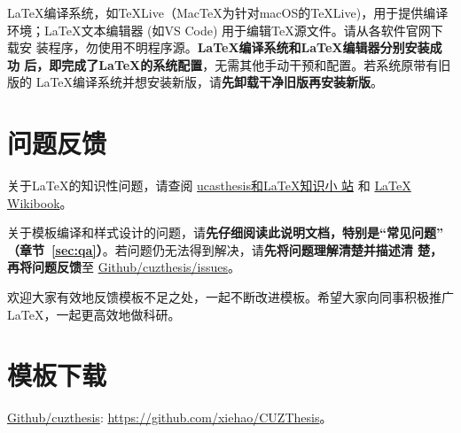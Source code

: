 \LaTeX{}编译系统，如\TeX{}Live（Mac\TeX{}为针对macOS的\TeX{}Live)，用于提供编译
环境；\LaTeX{}文本编辑器 (如VS Code) 用于编辑\TeX{}源文件。请从各软件官网下载安
装程序，勿使用不明程序源。\textbf{\LaTeX{}编译系统和\LaTeX{}编辑器分别安装成功
后，即完成了\LaTeX{}的系统配置}，无需其他手动干预和配置。若系统原带有旧版的
\LaTeX{}编译系统并想安装新版，请\textbf{先卸载干净旧版再安装新版}。

\section{问题反馈}\label{sec:callback}

关于\LaTeX{}的知识性问题，请查阅
\href{https://github.com/mohuangrui/ucasthesis/wiki}{ucasthesis和\LaTeX{}知识小
站} 和 \href{https://en.wikibooks.org/wiki/LaTeX}{\LaTeX{} Wikibook}。

关于模板编译和样式设计的问题，请\textbf{先仔细阅读此说明文档，特别是“常见问题”
（章节~\ref{sec:qa}）}。若问题仍无法得到解决，请\textbf{先将问题理解清楚并描述清
楚，再将问题反馈}至
\href{https://github.com/xiehao/CUZThesis/issues}{Github/cuzthesis/issues}。

欢迎大家有效地反馈模板不足之处，一起不断改进模板。希望大家向同事积极推广
\LaTeX{}，一起更高效地做科研。

\section{模板下载}\label{sec:download}

\begin{center}
    \href{https://github.com/xiehao/CUZThesis}{Github/cuzthesis}:
    \url{https://github.com/xiehao/CUZThesis}。
\end{center}
